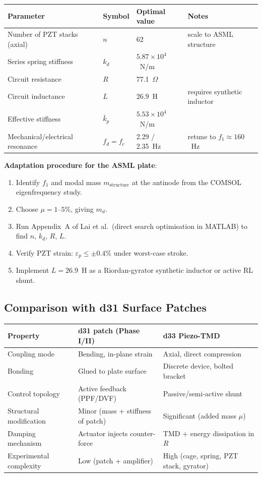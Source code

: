 \documentclass[12pt,a4paper]{article}
\begin{document}
\begin{center}
\begin{tabular}{llll}
\toprule
Parameter & Symbol & Optimal value & Notes \\
\midrule
Number of PZT stacks (axial) & $n$ & 62 & scale to ASML structure \\
Series spring stiffness & $k_d$ & $5.87 \times 10^4$~N/m & \\
Circuit resistance & $R$ & 77.1~$\Omega$ & \\
Circuit inductance & $L$ & 26.9~H & requires synthetic inductor \\
Effective stiffness & $\bar{k}_p$ & $5.53 \times 10^4$~N/m & \\
Mechanical/electrical resonance & $f_d = f_c$ & 2.29 / 2.35~Hz & retune to $f_1 \approx 160$~Hz \\
\bottomrule
\end{tabular}
\end{center}

\textbf{Adaptation procedure for the ASML plate}:
\begin{enumerate}
  \item Identify $f_1$ and modal mass $m_\text{structure}$ at the antinode from the
        COMSOL eigenfrequency study.
  \item Choose $\mu = 1$--$5\%$, giving $m_d$.
  \item Run Appendix~A of Lai et al.\ (direct search optimisation in MATLAB) to
        find $n$, $k_d$, $R$, $L$.
  \item Verify PZT strain: $\varepsilon_p \leq \pm 0.4\%$ under worst-case stroke.
  \item Implement $L = 26.9$~H as a Riordan-gyrator synthetic inductor or active
        RL shunt.
\end{enumerate}

\subsection*{Comparison with d31 Surface Patches}

\begin{center}
\begin{tabular}{lll}
\toprule
Property & d31 patch (Phase I/II) & d33 Piezo-TMD \\
\midrule
Coupling mode & Bending, in-plane strain & Axial, direct compression \\
Bonding & Glued to plate surface & Discrete device, bolted bracket \\
Control topology & Active feedback (PPF/DVF) & Passive/semi-active shunt \\
Structural modification & Minor (mass + stiffness of patch) & Significant (added mass $\mu$) \\
Damping mechanism & Actuator injects counter-force & TMD + energy dissipation in $R$ \\
Experimental complexity & Low (patch + amplifier) & High (cage, spring, PZT stack, gyrator) \\
\bottomrule
\end{tabular}
\end{center}
\end{document}
